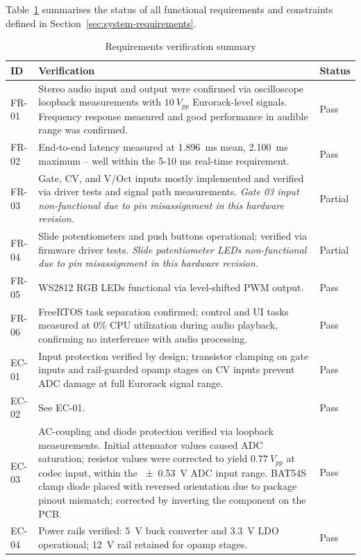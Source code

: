 
Table~\ref{tab:req-verification} summarises the status of all functional
requirements and constraints defined in Section~\ref{sec:system-requirements}.
\begin{table}[H]
	\centering
	\caption{Requirements verification summary}
	\label{tab:req-verification}
	\begin{tabularx}{\linewidth}{@{} l X l @{}}
		\toprule
		\textbf{ID} & \textbf{Verification} & \textbf{Status} \\
		\midrule
		FR-01 & Stereo audio input and output were confirmed via oscilloscope loopback measurements with $\qty{10}{V_{pp}}$ Eurorack-level signals. Frequency response measured and good performance in audible range was confirmed. & Pass \\
		FR-02 & End-to-end latency measured at \qty{1.896}{ms} mean, \qty{2.100}{ms} maximum -- well within the 5-10 ms real-time requirement. & Pass \\
		FR-03 & Gate, CV, and V/Oct inputs mostly implemented and verified via driver tests and signal path measurements. \textit{Gate 03 input non-functional due to pin misassignment in this hardware revision.} & Partial \\
		FR-04 & Slide potentiometers and push buttons operational; verified via firmware driver tests. \textit{Slide potentiometer LEDs non-functional due to pin misassignment in this hardware revision.} & Partial \\
		FR-05 & WS2812 RGB LEDs functional via level-shifted PWM output. & Pass \\
		FR-06 & FreeRTOS task separation confirmed; control and UI tasks measured at 0\% CPU utilization during audio playback, confirming no interference with audio processing. & Pass \\
		\midrule
		EC-01 & Input protection verified by design; transistor clamping on gate inputs and rail-guarded opamp stages on CV inputs prevent ADC damage at full Eurorack signal range. & Pass \\
		EC-02 & See EC-01. & Pass \\
		EC-03 & AC-coupling and diode protection verified via loopback measurements. Initial attenuator values caused ADC saturation; resistor values were corrected to yield $\qty{0.77}{V_{pp}}$ at codec input, within the \qty{\pm 0.53}{V} ADC input range. BAT54S clamp diode placed with reversed orientation due to package pinout mismatch; corrected by inverting the component on the PCB. & Pass \\
		EC-04 & Power rails verified: \qty{5}{V} buck converter and \qty{3.3}{V} LDO operational; \qty{12}{V} rail retained for opamp stages. & Pass \\

\end{tabularx}
\end{table}
